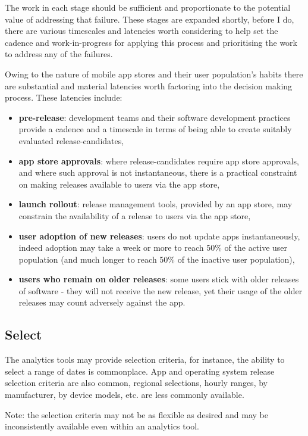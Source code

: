 The work in each stage should be sufficient and proportionate to the potential value of addressing that failure. These stages are expanded shortly, before I do, there are various timescales and latencies worth considering to help set the cadence and work-in-progress for applying this process and prioritising the work to address any of the failures.

Owing to the nature of mobile app stores and their user population's habits there are substantial and material latencies worth factoring into the decision making process. These latencies include:
\begin{itemize}
    \item \textbf{pre-release}: development teams and their software development practices provide a cadence and a timescale in terms of being able to create suitably evaluated release-candidates,
    \item \textbf{app store approvals}: where release-candidates require app store approvals, and where such approval is not instantaneous, there is a practical constraint on making releases available to users via the app store,
    \item \textbf{launch rollout}: release management tools, provided by an app store, may constrain the availability of a release to users via the app store,
    \item \textbf{user adoption of new releases}: users do not update apps instantaneously, indeed adoption may take a week or more to reach 50\% of the active user population (and much longer to reach 50\% of the inactive user population), 
    \item \textbf{users who remain on older releases}: some users stick with older releases of software - they will not receive the new release, yet their usage of the older releases may count adversely against the app.
\end{itemize}

\subsection{Select}
The analytics tools may provide selection criteria, for instance, the ability to select a range of dates is commonplace. App and operating system release selection criteria are also common, regional selections, hourly ranges, by manufacturer, by device models, etc. are less commonly available.

Note: the selection criteria may not be as flexible as desired and may be inconsistently available even within an analytics tool.

